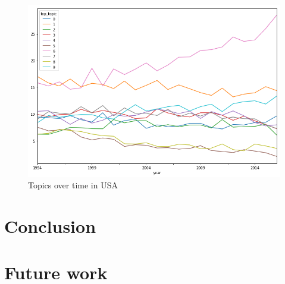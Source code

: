 \documentclass[12pt]{report}
\begin{document}
\begin{center}
\begin{figure}
\includegraphics[width=1.0\textwidth, natwidth=707,natheight=483]
{figs/topic-evolution-usa.png}
\caption{Topics over time in USA}
\end{figure}
\end{center}



\section{Conclusion}

\section{Future work}

{}



\clearpage
\appendix
\end{document}

